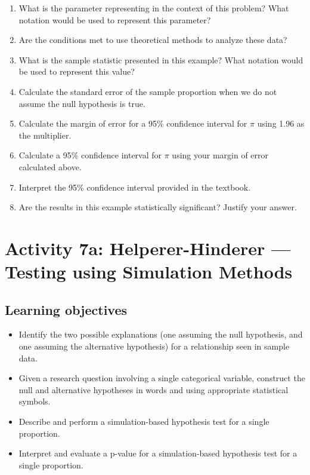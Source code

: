 \documentclass[
]{report}
\newcommand{\rgs}{\vspace{12pt}} %
\begin{document}
\begin{enumerate}
\def\labelenumi{\arabic{enumi}.}
\item
  What is the parameter representing in the context of this problem? What notation would be used to represent this parameter?
  \rgs
  \rgs
\item
  Are the conditions met to use theoretical methods to analyze these data?
  \rgs
  \rgs
\item
  What is the sample statistic presented in this example? What notation would be used to represent this value?
  \rgs
\item
  Calculate the standard error of the sample proportion when we do not assume the null hypothesis is true.
  \rgs
  \rgs
\item
  Calculate the margin of error for a 95\% confidence interval for \(\pi\) using 1.96 as the multiplier.
  \rgs
  \rgs
\item
  Calculate a 95\% confidence interval for \(\pi\) using your margin of error calculated above.
  \rgs
  \rgs
\item
  Interpret the 95\% confidence interval provided in the textbook.
  \rgs
  \rgs
\item
  Are the results in this example statistically significant? Justify your answer.
  \rgs
\end{enumerate}

\newpage

\hypertarget{activity-7a-helperer-hinderer-testing-using-simulation-methods}{%
\section{Activity 7a: Helperer-Hinderer --- Testing using Simulation Methods}\label{activity-7a-helperer-hinderer-testing-using-simulation-methods}}


\hypertarget{learning-objectives-6}{%
\subsection{Learning objectives}\label{learning-objectives-6}}

\begin{itemize}
\item
  Identify the two possible explanations (one assuming the null hypothesis, and one assuming the alternative hypothesis) for a relationship seen in sample data.
\item
  Given a research question involving a single categorical variable, construct the null and alternative hypotheses
  in words and using appropriate statistical symbols.
\item
  Describe and perform a simulation-based hypothesis test for a single proportion.
\item
  Interpret and evaluate a p-value for a simulation-based hypothesis test for a single proportion.
\end{itemize}
\end{document}
